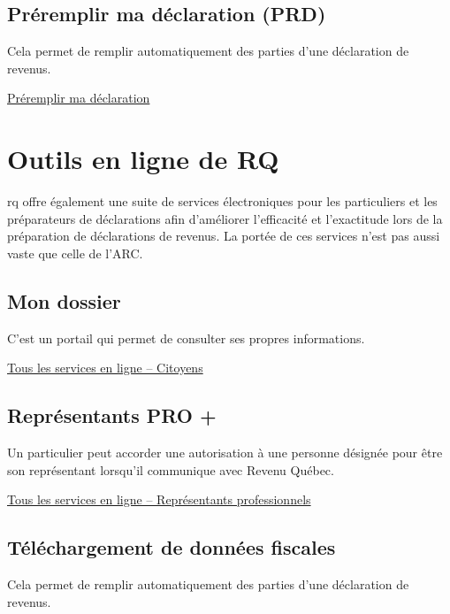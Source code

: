 \subsection{Préremplir ma déclaration (PRD)}
Cela permet de remplir automatiquement des parties d'une déclaration de revenus.

\cat\href{https://www.canada.ca/fr/agence-revenu/services/services-electroniques/a-propos-preremplir-declaration.html}{Préremplir ma déclaration}



\section{Outils en ligne de RQ}
\begin{intro}
	\acrfull{rq} offre également une suite de services électroniques pour les particuliers et les préparateurs de déclarations afin d'améliorer l'efficacité et l'exactitude lors de la préparation de déclarations de revenus. La portée de ces services n'est pas aussi vaste que celle de l'ARC.
\end{intro}


\subsection{Mon dossier}
C'est un portail qui permet de consulter ses propres informations.

\qct\href{https://www.revenuquebec.ca/fr/services-en-ligne/services-en-ligne/services-en-ligne/citoyens/}{Tous les services en ligne – Citoyens}


\subsection{Représentants PRO +}
Un particulier peut accorder une autorisation à une personne désignée pour être son représentant lorsqu'il communique avec Revenu Québec.

\qct\href{https://www.revenuquebec.ca/fr/services-en-ligne/services-en-ligne/services-en-ligne/representants-professionnels/}{Tous les services en ligne – Représentants professionnels}


\subsection{Téléchargement de données fiscales}
Cela permet de remplir automatiquement des parties d'une déclaration de revenus.



